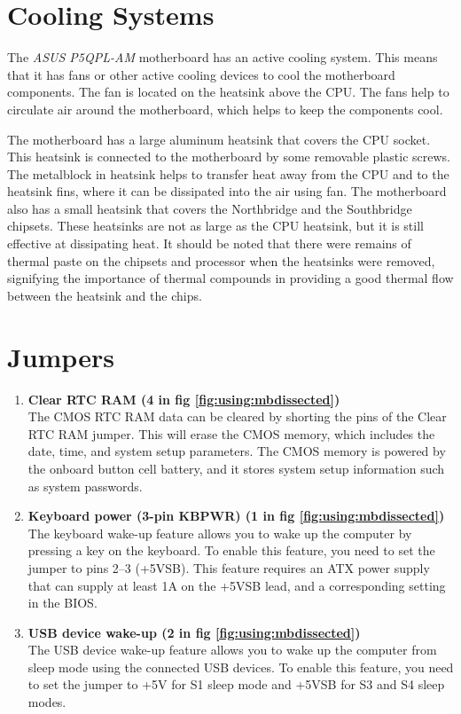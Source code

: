 \section{Cooling Systems}

The \emph{ASUS P5QPL-AM} motherboard has an active cooling system. This means that it has fans or other active cooling devices to cool the motherboard components. The fan is located on the heatsink above the CPU. The fans help to circulate air around the motherboard, which helps to keep the components cool.

The motherboard has a large aluminum heatsink that covers the CPU socket. This heatsink is connected to the motherboard by some removable plastic screws. The metalblock in heatsink helps to transfer heat away from the CPU and to the heatsink fins, where it can be dissipated into the air using fan. The motherboard also has a small heatsink that covers the Northbridge and the Southbridge chipsets. These heatsinks are not as large as the CPU heatsink, but it is still effective at dissipating heat. It should be noted that there were remains of thermal paste on the chipsets and processor when the heatsinks were removed, signifying the importance of thermal compounds in providing a good thermal flow between the heatsink and the chips.

\section{Jumpers}
\begin{enumerate}
    \item \textbf{Clear RTC RAM (4 in fig \ref{fig:using:mbdissected})} \\ 
        The CMOS RTC RAM data can be cleared by shorting the pins of the Clear RTC RAM jumper. This will erase the CMOS memory, which includes the date, time, and system setup parameters. The CMOS memory is powered by the onboard button cell battery, and it stores system setup information such as system passwords.
    \item \textbf {Keyboard power (3-pin KBPWR) (1 in fig \ref{fig:using:mbdissected})} \\
        The keyboard wake-up feature allows you to wake up the computer by pressing a key on the keyboard. To enable this feature, you need to set the jumper to pins 2–3 (+5VSB). This feature requires an ATX power supply that can supply at least 1A on the +5VSB lead, and a corresponding setting in the BIOS.
    \item \textbf{USB device wake-up (2 in fig \ref{fig:using:mbdissected})} \\
        The USB device wake-up feature allows you to wake up the computer from sleep mode using the connected USB devices. To enable this feature, you need to set the jumper to +5V for S1 sleep mode and +5VSB for S3 and S4 sleep modes.


\end{enumerate}

